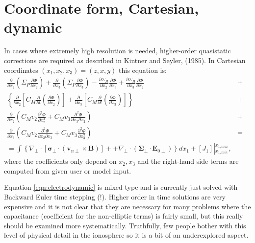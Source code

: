 \documentclass[11pt,letterpaper]{article}
\begin{document}
\section{Coordinate form, Cartesian, dynamic}

In cases where extremely high resolution is needed, higher-order quasistatic corrections are required as described in Kintner and Seyler, (1985).  In Cartesian coordinates $(x_1,x_2,x_3)=(z,x,y)$ this equation is:  
\begin{eqnarray}
\frac{\partial}{\partial x_2} \left( \Sigma_P \frac{\partial \Phi}{\partial x_2} \right) + \frac{\partial}{\partial x_3} \left( \Sigma_P \frac{\partial \Phi}{\partial x_3} \right) -  \frac{\partial \Sigma_H}{\partial x_2} \frac{\partial \Phi}{\partial x_3} + \frac{\partial \Sigma_H}{\partial x_3} \frac{\partial \Phi}{\partial x_2} &+& \nonumber \\ 
\left\{ \frac{\partial}{\partial x_2} \left[ C_M \frac{\partial}{\partial t} \left( \frac{\partial \Phi}{\partial x_2} \right) \right] + \frac{\partial}{\partial x_3} \left[ C_M \frac{\partial}{\partial t} \left( \frac{\partial \Phi}{\partial x_3} \right) \right] \right\} &+& \nonumber \\
\frac{\partial}{\partial x_2} \left( C_M v_2 \frac{\partial^2 \Phi}{\partial x_2^2} + C_M v_3 \frac{\partial^2 \Phi}{\partial x_3 \partial x_2} \right) &+& \nonumber \\
\frac{\partial}{\partial x_3} \left( C_M v_2 \frac{\partial^2 \Phi}{\partial x_2 \partial x_3} + C_M v_3 \frac{\partial^2 \Phi}{\partial x_3^2} \right) &=& \nonumber \\
= \int \left\{ \nabla_\perp \cdot \left[ \boldsymbol{\sigma}_\perp \cdot \left( \mathbf{v}_{n\perp} \times \mathbf{B} \right) \right] + + \nabla_\perp \cdot \left( \boldsymbol{\Sigma}_\perp \cdot \mathbf{E}_{0\perp} \right) \right\} d x_1 + \left[J_1 \right] \left|^{x_{1,max}}_{x_{1,min}} \right. , \label{eqn:electrodynamic}
\end{eqnarray}
where the coefficients only depend on $x_2,x_3$ and the right-hand side terms are computed from given user or model input.  

Equation \ref{eqn:electrodynamic} is mixed-type and is currently just solved with Backward Euler time stepping (!).  Higher order in time solutions are very expensive and it is not clear that they are necessary for many problems where the capacitance (coefficient for the non-elliptic terms) is fairly small, but this really should be examined more systematically.  Truthfully, few people bother with this level of physical detail in the ionosphere so it is a bit of an underexplored aspect.  
\end{document}
